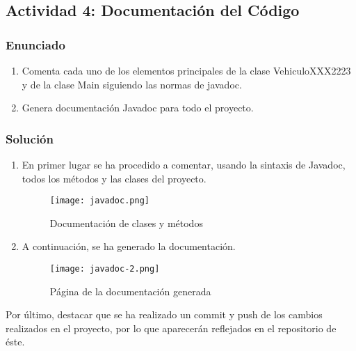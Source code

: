 \subsection{Actividad 4: Documentación del Código}
\subsubsection{Enunciado}
\begin{enumerate}
    \item Comenta cada uno de los elementos principales de la clase VehiculoXXX2223 y de la clase Main siguiendo las normas de javadoc.
    \item Genera documentación Javadoc para todo el proyecto.
\end{enumerate}

\subsubsection{Solución}
\begin{enumerate}
    \item En primer lugar se ha procedido a comentar, usando la sintaxis de Javadoc, todos los métodos y las clases del proyecto.

    \begin{figure}[ht]
        \centering
        \texttt{[image: javadoc.png]}
        \caption{Documentación de clases y métodos}
    \end{figure}

    \item A continuación, se ha generado la documentación.

    \begin{figure}[ht]
        \centering
        \texttt{[image: javadoc-2.png]}
        \caption{Página de la documentación generada}
    \end{figure}
\end{enumerate}

Por último, destacar que se ha realizado un commit y push de los cambios realizados en el proyecto, por lo que aparecerán reflejados en el repositorio de éste.


%
%

